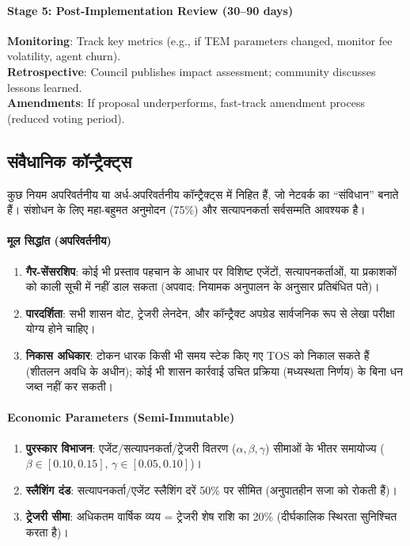 \documentclass[11pt]{article}
\begin{document}
\begin{itemize}[noitemsep]
\begin{itemize}[noitemsep]
\begin{itemize}[noitemsep]
\begin{itemize}[noitemsep]
\begin{itemize}[noitemsep]
\paragraph{Stage 5: Post-Implementation Review (30--90 days)}
\textbf{Monitoring}: Track key metrics (e.g., if TEM parameters changed, monitor fee volatility, agent churn).\\
\textbf{Retrospective}: Council publishes impact assessment; community discusses lessons learned.\\
\textbf{Amendments}: If proposal underperforms, fast-track amendment process (reduced voting period).

\subsection{संवैधानिक कॉन्ट्रैक्ट्स}

कुछ नियम अपरिवर्तनीय या अर्ध-अपरिवर्तनीय कॉन्ट्रैक्ट्स में निहित हैं, जो नेटवर्क का ``संविधान'' बनाते हैं। संशोधन के लिए महा-बहुमत अनुमोदन (75\%) और सत्यापनकर्ता सर्वसम्मति आवश्यक है।

\paragraph{मूल सिद्धांत (अपरिवर्तनीय)}
\begin{enumerate}[noitemsep]
  \item \textbf{गैर-सेंसरशिप}: कोई भी प्रस्ताव पहचान के आधार पर विशिष्ट एजेंटों, सत्यापनकर्ताओं, या प्रकाशकों को काली सूची में नहीं डाल सकता (अपवाद: नियामक अनुपालन के अनुसार प्रतिबंधित पते)।
  \item \textbf{पारदर्शिता}: सभी शासन वोट, ट्रेजरी लेनदेन, और कॉन्ट्रैक्ट अपग्रेड सार्वजनिक रूप से लेखा परीक्षा योग्य होने चाहिए।
  \item \textbf{निकास अधिकार}: टोकन धारक किसी भी समय स्टेक किए गए TOS को निकाल सकते हैं (शीतलन अवधि के अधीन); कोई भी शासन कार्रवाई उचित प्रक्रिया (मध्यस्थता निर्णय) के बिना धन जब्त नहीं कर सकती।
\end{enumerate}

\paragraph{Economic Parameters (Semi-Immutable)}
\begin{enumerate}[noitemsep]
  \item \textbf{पुरस्कार विभाजन}: एजेंट/सत्यापनकर्ता/ट्रेजरी वितरण ($\alpha, \beta, \gamma$) सीमाओं के भीतर समायोज्य ($\beta \in [0.10, 0.15]$, $\gamma \in [0.05, 0.10]$)।
  \item \textbf{स्लैशिंग दंड}: सत्यापनकर्ता/एजेंट स्लैशिंग दरें 50\% पर सीमित (अनुपातहीन सजा को रोकती हैं)।
  \item \textbf{ट्रेजरी सीमा}: अधिकतम वार्षिक व्यय = ट्रेजरी शेष राशि का 20\% (दीर्घकालिक स्थिरता सुनिश्चित करता है)।
\end{enumerate}


\end{itemize}
\end{itemize}
\end{itemize}
\end{itemize}
\end{itemize}
\end{document}
